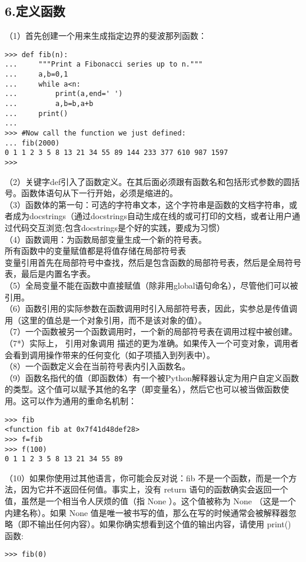 \documentclass{article}
\begin{document}
\begin{CJK}{UTF8}{gbsn}
\section*{6.定义函数}
（1）首先创建一个用来生成指定边界的斐波那列函数：
\begin{verbatim}
>>> def fib(n):
...     """Print a Fibonacci series up to n."""
...     a,b=0,1
...     while a<n:
...         print(a,end=' ')
...         a,b=b,a+b
...     print()
... 
>>> #Now call the function we just defined:
... fib(2000)
0 1 1 2 3 5 8 13 21 34 55 89 144 233 377 610 987 1597 
>>> 
\end{verbatim}
（2）关键字def引入了函数定义。在其后面必须跟有函数名和包括形式参数的圆括号。函数体语句从下一行开始，必须是缩进的。\\
（3）函数体的第一句：可选的字符串文本，这个字符串是函数的文档字符串，或者成为docstrings（通过docstrings自动生成在线的或可打印的文档，或者让用户通过代码交互浏览;包含docstrings是个好的实践，要成为习惯）\\
（4）函数调用：为函数局部变量生成一个新的符号表。\\
所有函数中的变量赋值都是将值存储在局部符号表\\
变量引用首先在局部符号中查找，然后是包含函数的局部符号表，然后是全局符号表，最后是内置名字表。\\
（5）全局变量不能在函数中直接赋值（除非用global语句命名），尽管他们可以被引用。\\
（6）函数引用的实际参数在函数调用时引入局部符号表，因此，实参总是传值调用（这里的值总是一个对象引用，而不是该对象的值）。\\
（7）一个函数被另一个函数调用时，一个新的局部符号表在调用过程中被创建。\\
（7*）实际上， 引用对象调用 描述的更为准确。如果传入一个可变对象，调用者会看到调用操作带来的任何变化（如子项插入到列表中）。\\
（8）一个函数定义会在当前符号表内引入函数名。\\
（9）函数名指代的值（即函数体）有一个被Python解释器认定为用户自定义函数的类型。这个值可以赋予其他的名字（即变量名），然后它也可以被当做函数使用。这可以作为通用的重命名机制：
\begin{verbatim}
>>> fib
<function fib at 0x7f41d48def28>
>>> f=fib
>>> f(100)
0 1 1 2 3 5 8 13 21 34 55 89 
\end{verbatim}
（10）如果你使用过其他语言，你可能会反对说：fib 不是一个函数，而是一个方法，因为它并不返回任何值。事实上，没有 return 语句的函数确实会返回一个值，虽然是一个相当令人厌烦的值（指 None ）。这个值被称为 None （这是一个内建名称）。如果 None 值是唯一被书写的值，那么在写的时候通常会被解释器忽略（即不输出任何内容）。如果你确实想看到这个值的输出内容，请使用 print() 函数:
\begin{verbatim}
>>> fib(0)


\end{verbatim}
\end{CJK}
\end{document}
